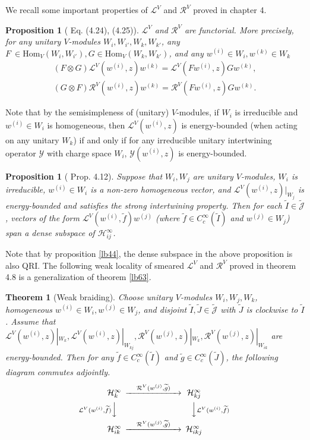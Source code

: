 \documentclass[12pt,a4paper]{article}
\theoremstyle{definition}
\theoremstyle{plain}
\newtheorem{thm}[df]{Theorem}
\newtheorem{pp}[df]{Proposition}
\newcommand{\mc}{\mathcal}
\newcommand{\wtd}{\widetilde}
\newcommand{\Hom}{\mathrm{Hom}}
\newcommand{\Jtd}{\widetilde{\mathcal J}}
\numberwithin{equation}{subsection}
\begin{document}
We recall some important properties of $\mc L^V$ and $\mc R^V$ proved in \cite{Gui21a} chapter 4.

\begin{pp}[\cite{Gui21a} Eq. (4.24), (4.25)]\label{lb57}
$\mc L^V$ and $\mc R^V$ are functorial. More precisely, for any unitary $V$-modules $W_i,W_{i'},W_k,W_{k'}$, any $F\ \in\Hom_V(W_i,W_{i'}),G\in\Hom_V(W_k,W_{k'})$, and any $w^{(i)}\in W_i,w^{(k)}\in W_k$
\begin{gather}
(F\otimes G)\mc L^V(w^{(i)},z)w^{(k)}=\mc L^V(Fw^{(i)},z)Gw^{(k)},\label{eq70}\\
(G\otimes F)\mc R^V(w^{(i)},z)w^{(k)}=\mc R^V(Fw^{(i)},z)Gw^{(k)}.\label{eq74}
\end{gather}
\end{pp}


Note that by the semisimpleness of (unitary) $V$-modules, if $W_i$ is irreducible and $w^{(i)}\in W_i$ is homogeneous, then $\mc L^V(w^{(i)},z)$ is energy-bounded (when acting on any unitary $W_k$) if and only if  for any irreducible unitary intertwining operator $\mc Y$ with charge space $W_i$, $\mc Y(w^{(i)},z)$ is energy-bounded.

\begin{pp}[\cite{Gui21a} Prop. 4.12]\label{lb58}
Suppose that $W_i,W_j$ are unitary $V$-modules, $W_i$ is irreducible, $w^{(i)}\in W_i$ is a non-zero homogeneous vector, and $\mc L^V(w^{(i)},z)|_{W_j}$ is energy-bounded and satisfies the strong intertwining property.  Then for each  $\wtd I\in\Jtd$, vectors of the form $\mc L^V(w^{(i)},\wtd f)w^{(j)}$ (where $\wtd f\in C_c^\infty(\wtd I)$ and $w^{(j)}\in W_j$) span a dense subspace of $\mc H_{ij}^\infty$.
\end{pp}


Note that by proposition \ref{lb44}, the dense subspace in the above proposition is also QRI. The following weak locality of smeared $\mc L^V$ and $\mc R^V$  proved in \cite{Gui21a} theorem 4.8 is a generalization of theorem \ref{lb63}.

\begin{thm}[Weak braiding]\label{lb60}
Choose unitary $V$-modules $W_i,W_j,W_k$, homogeneous $w^{(i)}\in W_i,w^{(j)}\in W_j$, and disjoint $\wtd I,\wtd J\in \Jtd$ with $\wtd J$ is clockwise to $\wtd I$. Assume that  $\mc L^V(w^{(i)},z)|_{W_k},\mc L^V(w^{(i)},z)|_{W_{kj}},\mc R^V(w^{(j)},z)|_{W_k},\mc R^V(w^{(j)},z)|_{W_{ik}}$ are energy-bounded. Then for any $\wtd f\in C_c^\infty(\wtd I)$ and $\wtd g\in C_c^\infty(\wtd J)$, the following diagram commutes adjointly.
	\begin{align}\label{eq42}
	\begin{CD}
	\mc H^\infty_k @> \quad\mc R^V(w^{(j)},\wtd g)\quad >> \mc H^\infty_{kj}\\
	@V {\mc L^V(w^{(i)},\wtd f)} VV @VV {\mc L^V(w^{(i)},\wtd f)} V\\
	\mc H^\infty_{ik} @> \quad\mc R^V(w^{(j)},\wtd g)\quad>> \mc H^\infty_{ikj}
	\end{CD}
	\end{align}
\end{thm}
\end{document}
